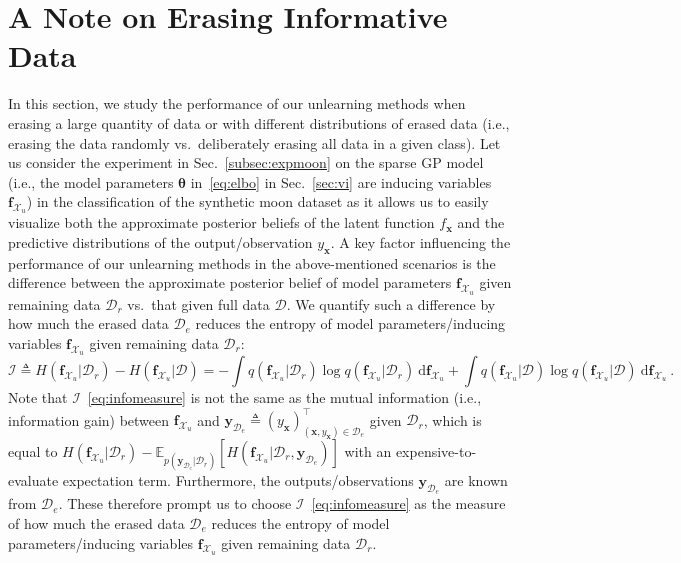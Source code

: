 \documentclass{article}
\theoremstyle{definition}
\newcommand{\mbf}[1]{\mathbf{#1}}
\newcommand{\mcl}[1]{\mathcal{#1}}
\newcommand{\mbb}[1]{\mathbb{#1}}
\newcommand{\da}{\mcl{D}}
\newcommand{\dc}{\mcl{D}_r}
\newcommand{\dr}{\mcl{D}_e}
\begin{document}
\section{A Note on Erasing Informative Data}
\label{app:information}
%
In this section, we study the performance of our unlearning methods when  erasing a large quantity of data or with different distributions of erased data (i.e., erasing the data randomly vs.~deliberately erasing all data in a given class).
Let us consider the experiment in Sec.~\ref{subsec:expmoon} on the sparse GP model (i.e., the model parameters $\bm{\theta}$ in~\eqref{eq:elbo} in Sec.~\ref{sec:vi} are inducing variables $\mbf{f}_{\mcl{X}_u}$) in the classification of the synthetic moon dataset as it allows us to easily visualize both the approximate posterior beliefs of the latent function  $f_{\mbf{x}}$ and the predictive distributions of the output/observation $y_{\mbf{x}}$. 
A key factor influencing the performance of our unlearning methods in the above-mentioned scenarios is the difference between the approximate posterior belief of model parameters $\mbf{f}_{\mcl{X}_u}$ given remaining data $\dc$ vs.~that given full data $\da$. We quantify such a difference by how much the erased data $\dr$ reduces the entropy of model parameters/inducing variables $\mbf{f}_{\mcl{X}_u}$ given remaining data $\dc$:
%
\begin{equation}
    \mcl{I} \triangleq H(\mbf{f}_{\mcl{X}_u}| \dc) - H(\mbf{f}_{\mcl{X}_u}| \da) 
    = 
    - \int q(\mbf{f}_{\mcl{X}_u}| \dc) \log q(\mbf{f}_{\mcl{X}_u}| \dc)\ \text{d}\mbf{f}_{\mcl{X}_u}
    + \int q(\mbf{f}_{\mcl{X}_u}| \da) \log q(\mbf{f}_{\mcl{X}_u}| \da)\ \text{d}\mbf{f}_{\mcl{X}_u}\ .
    \label{eq:infomeasure}
\end{equation}
%
Note that $\mcl{I}$~\eqref{eq:infomeasure} is not the same as the mutual information (i.e.,  information gain) between $\mbf{f}_{\mcl{X}_u}$ and $\mbf{y}_{\dr}\triangleq (y_\mbf{x})^\top_{(\mbf{x},y_\mbf{x})\in \dr}$ 
given $\dc$, which is equal to $ H(\mbf{f}_{\mcl{X}_u}| \dc) - \mbb{E}_{p(\mbf{y}_{\dr}| \dc)} \left[ H(\mbf{f}_{\mcl{X}_u}| \dc, \mbf{y}_{\dr}) \right]$  %
with an expensive-to-evaluate 
expectation term.
Furthermore, the outputs/observations $\mbf{y}_{\dr}$ are known from $\dr$. 
These therefore prompt us to choose  $\mcl{I}$~\eqref{eq:infomeasure} as the measure of how much the erased data $\dr$ reduces the entropy of model parameters/inducing variables $\mbf{f}_{\mcl{X}_u}$ given remaining data $\dc$. 
\end{document}
